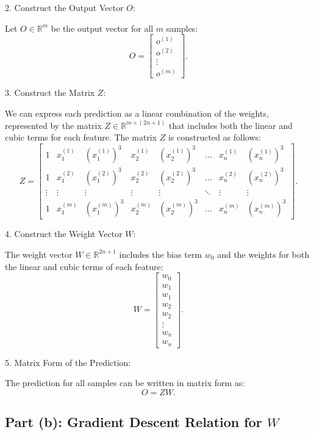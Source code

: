 \documentclass{article}
\begin{document}
	2. Construct the Output Vector \(O\):
	
	Let \(O \in \mathbb{R}^m\) be the output vector for all \(m\) samples:
	\[
	O = \begin{bmatrix} o^{(1)} \\ o^{(2)} \\ \vdots \\ o^{(m)} \end{bmatrix}.
	\]
	
	3. Construct the Matrix \(Z\):
	
	We can express each prediction as a linear combination of the weights, represented by the matrix \(Z \in \mathbb{R}^{m \times (2n+1)}\) that includes both the linear and cubic terms for each feature. The matrix \(Z\) is constructed as follows:
	\[
	Z = \begin{bmatrix} 
		1 & x_1^{(1)} & (x_1^{(1)})^3 & x_2^{(1)} & (x_2^{(1)})^3 & \dots & x_n^{(1)} & (x_n^{(1)})^3 \\ 
		1 & x_1^{(2)} & (x_1^{(2)})^3 & x_2^{(2)} & (x_2^{(2)})^3 & \dots & x_n^{(2)} & (x_n^{(2)})^3 \\ 
		\vdots & \vdots & \vdots & \vdots & \vdots & \ddots & \vdots & \vdots \\ 
		1 & x_1^{(m)} & (x_1^{(m)})^3 & x_2^{(m)} & (x_2^{(m)})^3 & \dots & x_n^{(m)} & (x_n^{(m)})^3 
	\end{bmatrix}.
	\]
	
	4. Construct the Weight Vector \(W\):
	
	The weight vector \(W \in \mathbb{R}^{2n+1}\) includes the bias term \(w_0\) and the weights for both the linear and cubic terms of each feature:
	\[
	W = \begin{bmatrix} w_0 \\ w_1 \\ w_1 \\ w_2 \\ w_2 \\ \vdots \\ w_n \\ w_n \end{bmatrix}.
	\]
	
	5. Matrix Form of the Prediction:
	
	The prediction for all samples can be written in matrix form as:
	\[
	O = Z W.
	\]
	
	\subsection*{Part (b): Gradient Descent Relation for \(W\)}
	
\end{document}
